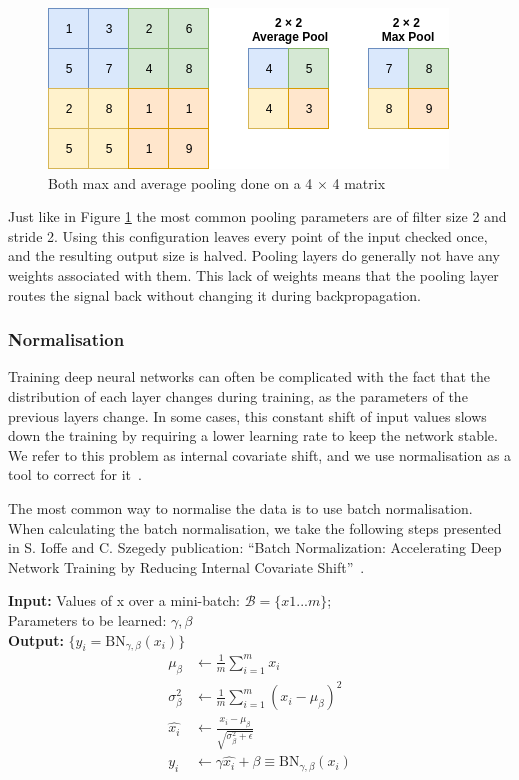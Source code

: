 \begin{figure}[h]
        \centering
        \includegraphics[scale=0.7]{background/figures/pooling.png}
        \caption{Both max and average pooling done on a 4 $\times$ 4 matrix}
        \label{fig:pooling}
\end{figure}

Just like in Figure \ref{fig:pooling} the most common pooling parameters are of filter size 2 and stride 2. Using this configuration leaves every point of the input checked once, and the resulting output size is halved. 
Pooling layers do generally not have any weights associated with them. This lack of weights means that the pooling layer routes the signal back without changing it during backpropagation.

\subsubsection{Normalisation}
\label{cha:normalisation}
Training deep neural networks can often be complicated with the fact that the distribution of each layer changes during training, as the parameters of the previous layers change. In some cases, this constant shift of input values slows down the training by requiring a lower learning rate to keep the network stable.
We refer to this problem as internal covariate shift, and we use normalisation as a tool to correct for it~\cite{DBLP:journals/corr/IoffeS15}.

The most common way to normalise the data is to use batch normalisation. When calculating the batch normalisation, we take the following steps presented in S. Ioffe and C. Szegedy publication: ``Batch Normalization: Accelerating Deep Network Training by Reducing Internal Covariate Shift''~\cite{DBLP:journals/corr/IoffeS15}.

\clearpage
\noindent \textbf{Input:} Values of x over a mini-batch: $\mathcal{B} = \{x1...m\}$;\\
\noindent Parameters to be learned: $\gamma, \beta$\\
\noindent \textbf{Output:} $\{y_i = \text{BN}_{\gamma,\beta}(x_i)\}$\\
\begin{align*}
\mu_{\beta} &\leftarrow \frac{1}{m} \sum_{i=1}^{m} x_i   \tag{mini-batch mean}\\
\sigma_{\beta}^2 &\leftarrow \frac{1}{m} \sum_{i=1}^{m} (x_i-\mu_{\beta})^2 \tag{mini-batch variance}\\
\widehat{x_i} &\leftarrow \frac{x_i - \mu_{\beta}}{\sqrt{\sigma_{\beta}^2+\epsilon}} \tag{normalise}\\
y_i &\leftarrow \gamma\widehat{x_i}  + \beta \equiv \text{BN}_{\gamma,\beta}(x_i) \tag{scale and shift}
\end{align*}
\label{eq:BN}


